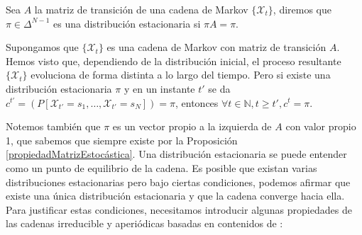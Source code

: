 \begin{definition}
Sea $A$ la matriz de transición de una cadena de Markov $\{\mathcal{X}_t\}$, diremos que $\pi\in\Delta^{N-1}$ es una distribución estacionaria si $\pi A=\pi$.
\end{definition}

Supongamos que $\{\mathcal{X}_t\}$ es una cadena de Markov con matriz de transición $A$. Hemos visto que, dependiendo de la distribución inicial, el proceso resultante $\{\mathcal{X}_t\}$ evoluciona de forma distinta a lo largo del tiempo. Pero si existe una distribución estacionaria $\pi$ y en un instante $t'$ se da $c^{t'}= (P[\mathcal{X}_{t'}=s_1,\dots,\mathcal{X}_{t'}=s_N]) =\pi$, entonces $\forall t\in\mathbb{N}, t\geq t', c^t=\pi$. 

Notemos también que $\pi$ es un vector propio a la izquierda de $A$ con valor propio 1, que sabemos que siempre existe por la Proposición \ref{propiedadMatrizEstocástica}. Una distribución estacionaria se puede entender como un punto de equilibrio de la cadena. Es posible que existan varias distribuciones estacionarias pero bajo ciertas condiciones, podemos afirmar que existe una única distribución estacionaria y que la cadena converge hacia ella. Para justificar estas condiciones, necesitamos introducir algunas propiedades de las cadenas irreducible y aperiódicas basadas en contenidos de \cite{Klappenecker}:

